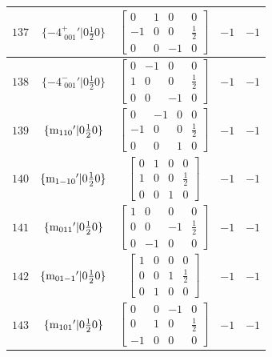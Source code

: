 \documentclass[fleqn,8pt]{jsarticle}
\begin{document}
\begin{longtable}{ccccc}
$ 137 $ & $ \{-4^{+}_{\,\,001}{}'|0 \frac{1}{2} 0\} $ & $ \begin{bmatrix} 0 & 1 & 0 & 0 \\ -1 & 0 & 0 & \frac{1}{2} \\ 0 & 0 & -1 & 0 \end{bmatrix} $ & $ -1 $ & $ -1 $ \\ \hline
$ 138 $ & $ \{-4^{-}_{\,\,001}{}'|0 \frac{1}{2} 0\} $ & $ \begin{bmatrix} 0 & -1 & 0 & 0 \\ 1 & 0 & 0 & \frac{1}{2} \\ 0 & 0 & -1 & 0 \end{bmatrix} $ & $ -1 $ & $ -1 $ \\ \hline
$ 139 $ & $ \{{\rm m}_{110}{}'|0 \frac{1}{2} 0\} $ & $ \begin{bmatrix} 0 & -1 & 0 & 0 \\ -1 & 0 & 0 & \frac{1}{2} \\ 0 & 0 & 1 & 0 \end{bmatrix} $ & $ -1 $ & $ -1 $ \\ \hline
$ 140 $ & $ \{{\rm m}_{1-10}{}'|0 \frac{1}{2} 0\} $ & $ \begin{bmatrix} 0 & 1 & 0 & 0 \\ 1 & 0 & 0 & \frac{1}{2} \\ 0 & 0 & 1 & 0 \end{bmatrix} $ & $ -1 $ & $ -1 $ \\ \hline
$ 141 $ & $ \{{\rm m}_{011}{}'|0 \frac{1}{2} 0\} $ & $ \begin{bmatrix} 1 & 0 & 0 & 0 \\ 0 & 0 & -1 & \frac{1}{2} \\ 0 & -1 & 0 & 0 \end{bmatrix} $ & $ -1 $ & $ -1 $ \\ \hline
$ 142 $ & $ \{{\rm m}_{01-1}{}'|0 \frac{1}{2} 0\} $ & $ \begin{bmatrix} 1 & 0 & 0 & 0 \\ 0 & 0 & 1 & \frac{1}{2} \\ 0 & 1 & 0 & 0 \end{bmatrix} $ & $ -1 $ & $ -1 $ \\ \hline
$ 143 $ & $ \{{\rm m}_{101}{}'|0 \frac{1}{2} 0\} $ & $ \begin{bmatrix} 0 & 0 & -1 & 0 \\ 0 & 1 & 0 & \frac{1}{2} \\ -1 & 0 & 0 & 0 \end{bmatrix} $ & $ -1 $ & $ -1 $ \\ \hline

\end{longtable}
\end{document}
